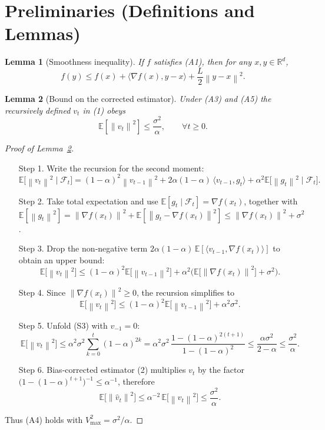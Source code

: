 \documentclass{article}
\newtheorem{lemma}{Lemma}
\newcommand{\E}{\mathbb{E}}
\newcommand{\R}{\mathbb{R}}
\newcommand{\norm}[1]{\left\|#1\right\|}
\newcommand{\ip}[2]{\langle #1,#2\rangle}
\newcommand{\grad}{\nabla}
\begin{document}
\newpage
\section*{Preliminaries (Definitions and Lemmas)}
\begin{lemma}[Smoothness inequality]\label{lem:smooth}
If $f$ satisfies (A1), then for any $x,y\in\R^{d}$,
\[
f(y)\le f(x)+\ip{\grad f(x)}{y-x}+ \frac{L}{2}\norm{y-x}^{2}.
\]
\end{lemma}
\begin{lemma}[Bound on the corrected estimator]\label{lem:estbound}
Under (A3) and (A5) the recursively defined $v_{t}$ in (1) obeys
\[
\E\!\left[\norm{\hat v_{t}}^{2}\right]\le \frac{\sigma^{2}}{\alpha},
\qquad\forall t\ge0 .
\]
\end{lemma}
\begin{proof}[Proof of Lemma~\ref{lem:estbound}]
\begin{enumerate}
\item[Step 1.] Write the recursion for the second moment:
\[
\E\!\bigl[\norm{v_{t}}^{2}\mid\mathcal F_{t}\bigr]
 = (1-\alpha)^{2}\norm{v_{t-1}}^{2}
   +2\alpha(1-\alpha)\,\ip{v_{t-1}}{g_{t}}
   +\alpha^{2}\E\!\bigl[\norm{g_{t}}^{2}\mid\mathcal F_{t}\bigr].
\tag{S1}
\]
\item[Step 2.] Take total expectation and use $\E[g_{t}\mid\mathcal F_{t}]=\grad f(x_t)$,
together with $\E[\norm{g_{t}}^{2}]=\norm{\grad f(x_t)}^{2}+
\E[\norm{g_{t}-\grad f(x_t)}^{2}]\le \norm{\grad f(x_t)}^{2}+\sigma^{2}$.
\item[Step 3.] Drop the non‑negative term $2\alpha(1-\alpha)\,\E[\ip{v_{t-1}}{\grad f(x_t)}]$
to obtain an upper bound:
\[
\E\!\bigl[\norm{v_{t}}^{2}\bigr]
\le (1-\alpha)^{2}\E\!\bigl[\norm{v_{t-1}}^{2}\bigr]
   +\alpha^{2}\bigl(\E\!\bigl[\norm{\grad f(x_t)}^{2}\bigr]+\sigma^{2}\bigr).
\tag{S2}
\]
\item[Step 4.] Since $\norm{\grad f(x_t)}^{2}\ge0$, the recursion simplifies to
\[
\E\!\bigl[\norm{v_{t}}^{2}\bigr]\le (1-\alpha)^{2}\E\!\bigl[\norm{v_{t-1}}^{2}\bigr]+\alpha^{2}\sigma^{2}.
\tag{S3}
\]
\item[Step 5.] Unfold (S3) with $v_{-1}=0$:
\[
\E\!\bigl[\norm{v_{t}}^{2}\bigr]
\le \alpha^{2}\sigma^{2}\sum_{k=0}^{t}(1-\alpha)^{2k}
= \alpha^{2}\sigma^{2}\,\frac{1-(1-\alpha)^{2(t+1)}}{1-(1-\alpha)^{2}}
\le \frac{\alpha\sigma^{2}}{2-\alpha}\le\frac{\sigma^{2}}{\alpha}.
\tag{S4}
\]
\item[Step 6.] Bias‑corrected estimator (2) multiplies $v_{t}$ by the factor
$\bigl(1-(1-\alpha)^{t+1}\bigr)^{-1}\le\alpha^{-1}$, therefore
\[
\E\!\bigl[\norm{\hat v_{t}}^{2}\bigr]
\le \alpha^{-2}\,\E\!\bigl[\norm{v_{t}}^{2}\bigr]
\le \frac{\sigma^{2}}{\alpha}.
\tag{S5}
\]
\end{enumerate}
Thus (A4) holds with $V_{\max}^{2}= \sigma^{2}/\alpha$. \qedhere
\end{proof}
\end{document}

